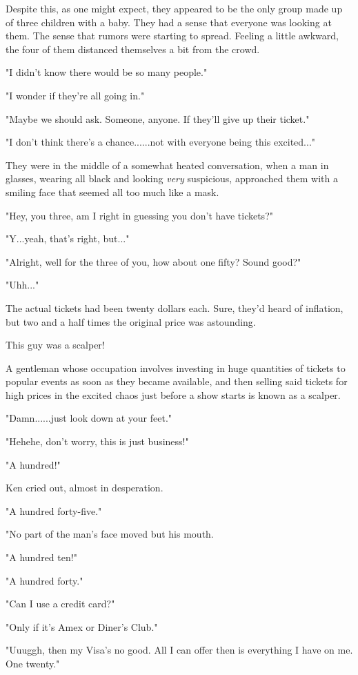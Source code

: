 \documentclass[
]{article}
\begin{document}
Despite this, as one might expect, they appeared to be the only group
made up of three children with a baby. They had a sense that everyone
was looking at them. The sense that rumors were starting to spread.
Feeling a little awkward, the four of them distanced themselves a bit
from the crowd.

"I didn't know there would be so many people."

"I wonder if they're all going in."

"Maybe we should ask. Someone, anyone. If they'll give up their ticket."

"I don't think there's a chance......not with everyone being this
excited..."

They were in the middle of a somewhat heated conversation, when a man in
glasses, wearing all black and looking \emph{very} suspicious,
approached them with a smiling face that seemed all too much like a
mask.

"Hey, you three, am I right in guessing you don't have tickets?"

"Y...yeah, that's right, but..."

"Alright, well for the three of you, how about one fifty? Sound good?"

"Uhh..."

The actual tickets had been twenty dollars each. Sure, they'd heard of
inflation, but two and a half times the original price was astounding.

This guy was a scalper!

A gentleman whose occupation involves investing in huge quantities of
tickets to popular events as soon as they became available, and then
selling said tickets for high prices in the excited chaos just before a
show starts is known as a scalper.

"Damn......just look down at your feet."

"Hehehe, don't worry, this is just business!"

"A hundred!"

Ken cried out, almost in desperation.

"A hundred forty-five."

"No part of the man's face moved but his mouth.

"A hundred ten!"

"A hundred forty."

"Can I use a credit card?"

"Only if it's Amex or Diner's Club."

"Uuuggh, then my Visa's no good. All I can offer then is everything I
have on me. One twenty."
\end{document}
